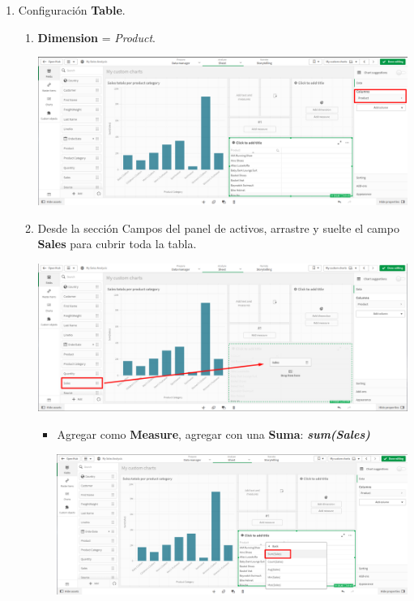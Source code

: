 \documentclass[12pt,letterpaper]{article}
\newcommand\tab[1][1cm]{\hspace*{#1}}
\begin{document}
\begin{enumerate}[\tab 1.]
\begin{enumerate}
\begin{center}
            \end{center}
        \end{enumerate}
        \item Configuración \textbf{Table}.
        \begin{enumerate}
            \item \textbf{Dimension} = \textit{Product}.
            \begin{center}
                \includegraphics[width=13cm]{./img/img31.1.png}
            \end{center}
            \item Desde la sección Campos del panel de activos, arrastre y suelte el campo \textbf{Sales} para cubrir toda la tabla.
            \begin{center}
                \includegraphics[width=13cm]{./img/img31.2.png}
            \end{center}
            \begin{itemize}
                \item Agregar como \textbf{Measure}, agregar con una \textbf{Suma}: \textit{\textbf{sum(Sales)}}
                \begin{center}
                    \includegraphics[width=13cm]{./img/img31.3.png}

\end{center}
\end{itemize}
\end{enumerate}
\end{enumerate}
\end{document}
